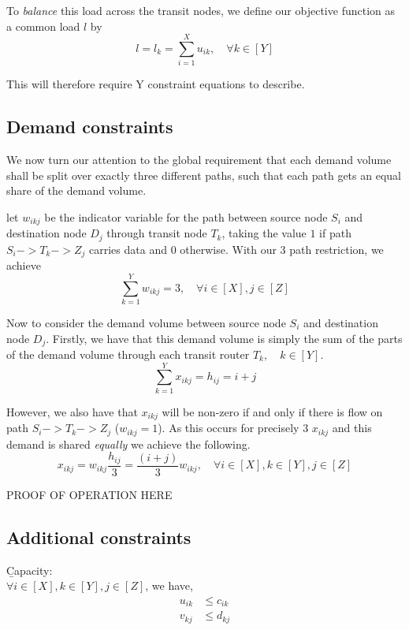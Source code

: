 \documentclass[12pt,twoside]{article}
\begin{document}
To \emph{balance} this load across the transit nodes, we define our objective function as a common load $l$ by
\begin{equation}
 l = l_k = \sum_{i=1}^{X}u_{ik},   \quad  \forall k \in [Y]
\end{equation}

This will therefore require Y constraint equations to describe.



\subsection{Demand constraints}
We now turn our attention to the global requirement that each demand volume shall be split over exactly three different paths, such that each path gets an equal
share of the demand volume.

let $w_{ikj}$ be the indicator variable for the path between source node $S_i$ and destination node $D_j$ through transit node $T_k$, taking the value $1$ if path $S_i->T_k->Z_j$ carries data and $0$ otherwise. With our 3 path restriction, we achieve
\begin{equation}
	\sum_{k=1}^{Y}w_{ikj} = 3,   \quad  \forall i \in [X],j \in [Z]
\end{equation}

Now to consider the demand volume between source node $S_i$ and destination node $D_j$. Firstly, we have that this demand volume is simply the sum of the parts of the demand volume through each transit router $T_k,\quad k \in [Y]$.
\begin{equation*}
	\sum_{k=1}^{Y}x_{ikj} = h_{ij}=i+j
\end{equation*}

However, we also have that $x_{ikj}$ will be non-zero if and only if there is flow on path $S_i->T_k->Z_j$ ($w_{ikj} = 1$). As this occurs for precisely 3 $x_{ikj}$ and this demand is shared \emph{equally} we achieve the following.
\begin{equation}
	x_{ikj} = w_{ikj} \frac{h_{ij}}{3} = \frac{(i + j)}{3}w_{ikj},\quad  \forall i \in [X],k \in [Y],j \in [Z]
\end{equation}

PROOF OF OPERATION HERE

\subsection{Additional constraints}\label{Sec: Const} 
\b{Capacity}:\\
$\forall i \in [X], k \in [Y], j \in [Z]$, we have,
\begin{align}
	u_{ik} &\leq c_{ik} \\
	v_{kj} &\leq d_{kj}  
\end{align}
\end{document}
